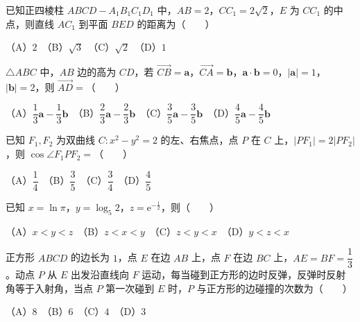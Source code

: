 \begin{question}
已知正四棱柱 $ABCD-A_1B_1C_1D_1$ 中，$AB=2$，$CC_1=2\sqrt2$，$E$ 为 $CC_1$ 的中点，则直线 $AC_1$ 到平面 $BED$ 的距离为\mbox{（　　）}

（A）$2$　（B）$\sqrt3$　（C）$\sqrt2$　（D）$1$

\end{question}
\begin{question}
$\triangle ABC$ 中，$AB$ 边的高为 $CD$，若 $\overrightarrow{CB}=\boldsymbol a$，$\overrightarrow{CA}=\boldsymbol b$，$\boldsymbol a\cdot\boldsymbol b=0$，$|\boldsymbol a|=1$，$|\boldsymbol b|=2$，则 $\overrightarrow{AD}=$\mbox{（　　）}

（A）$\dfrac13\boldsymbol a-\dfrac13\boldsymbol b$　（B）$\dfrac23\boldsymbol a-\dfrac23\boldsymbol b$　（C）$\dfrac35\boldsymbol a-\dfrac35\boldsymbol b$　（D）$\dfrac45\boldsymbol a-\dfrac45\boldsymbol b$

\end{question}
\begin{question}
已知 $F_1,F_2$ 为双曲线 $C:x^2-y^2=2$ 的左、右焦点，点 $P$ 在 $C$ 上，$|PF_1|=2|PF_2|$，则 $\cos\angle F_1PF_2=$\mbox{（　　）}

（A）$\dfrac14$　（B）$\dfrac35$　（C）$\dfrac34$　（D）$\dfrac45$

\end{question}
\begin{question}
已知 $x=\ln\pi$，$y=\log_5 2$，$z=\mathrm e^{-\frac12}$，则\mbox{（　　）}

（A）$x<y<z$　（B）$z<x<y$　（C）$z<y<x$　（D）$y<z<x$

\end{question}
\begin{question}
正方形 $ABCD$ 的边长为 $1$，点 $E$ 在边 $AB$ 上，点 $F$ 在边 $BC$ 上，$AE=BF=\dfrac13$。动点 $P$ 从 $E$ 出发沿直线向 $F$ 运动，每当碰到正方形的边时反弹，反弹时反射角等于入射角，当点 $P$ 第一次碰到 $E$ 时，$P$ 与正方形的边碰撞的次数为\mbox{（　　）}

（A）$8$　（B）$6$　（C）$4$　（D）$3$

\end{question}

